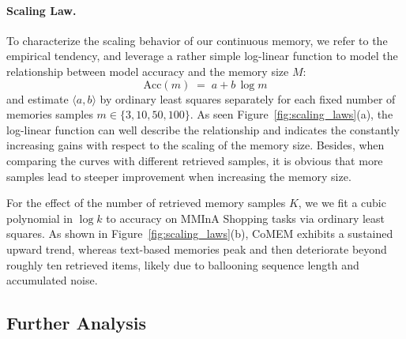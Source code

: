 \documentclass{article} %
\begin{document}
\paragraph{Scaling Law.}
To characterize the scaling behavior of our continuous memory, we refer to the empirical tendency, and leverage a rather simple log-linear function to model the relationship between model accuracy and the memory size $M$:
\begin{equation}
\mathrm{Acc}(m)\;=\;a+b\,\log m
\end{equation}
and estimate $\langle a,b \rangle$ by ordinary least squares separately for each fixed number of memories samples $m\in\{3,10,50,100\}$.
As seen Figure~\ref{fig:scaling_laws}(a), the log-linear function can well describe the relationship and indicates the constantly increasing gains with respect to the scaling of the memory size.
Besides, when comparing the curves with different retrieved samples, it is obvious that more samples lead to steeper improvement when increasing the memory size.


For the effect of the number of retrieved memory samples $K$, we we fit a cubic polynomial in $\log k$ to accuracy on MMInA Shopping tasks via ordinary least squares. As shown in Figure~\ref{fig:scaling_laws}(b), CoMEM exhibits a sustained upward trend, whereas text-based memories peak and then deteriorate beyond roughly ten retrieved items, likely due to ballooning sequence length and accumulated noise.


\subsection{Further Analysis}
\end{document}
